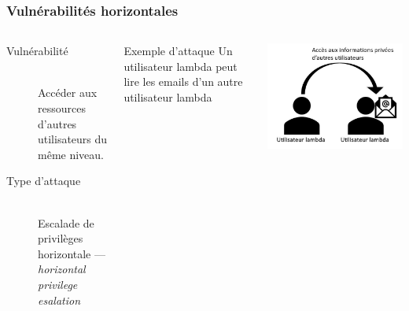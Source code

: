 \documentclass[aspectratio=169]{beamer}  %
\begin{document}
\begin{frame}
  \frametitle{Vulnérabilités horizontales}
  \begin{columns}[c]
      \begin{description}
        \item[Vulnérabilité] \hfill \\ Accéder aux ressources d'autres utilisateurs du même niveau.
        \item[Type d'attaque] \hfill \\ Escalade de privilèges horizontale --- \emph{horizontal privilege esalation}
      \end{description}
      \begin{block}{Exemple d'attaque}
        Un utilisateur lambda peut lire les emails d'un autre utilisateur lambda
      \end{block}
      \begin{center}
        \includegraphics[width=\textwidth]{escalade-hor}
      \end{center} 
  \end{columns}
\end{frame}
\end{document}
